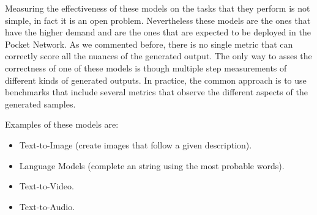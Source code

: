 Measuring the effectiveness of these models on the tasks that they perform is not simple, in fact it is an open problem. Nevertheless these models are the ones that have the higher demand and are the ones that are expected to be deployed in the Pocket Network. As we commented before, there is no single metric that can correctly score all the nuances of the generated output. The only way to asses the correctness of one of these models is though multiple step measurements of different kinds of generated outputs. In practice, the common approach is to use benchmarks that include several metrics that observe the different aspects of the generated samples.


Examples of these models are:
\begin{itemize}
    \item Text-to-Image (create images that follow a given description).
    \item Language Models (complete an string using the most probable words).
    \item Text-to-Video.
    \item Text-to-Audio.
\end{itemize}


